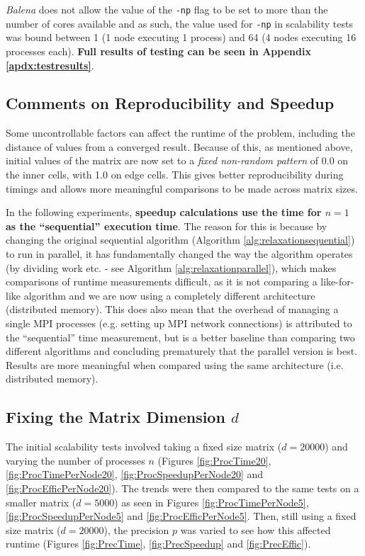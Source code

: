 \documentclass[11pt]{article}
\begin{document}
\textsl{Balena} does not allow the value of the \texttt{-np} flag to be set to more than the number of cores available and as such, the value used for \texttt{-np} in scalability tests was bound between 1 (1 node executing 1 process) and 64 (4 nodes executing 16 processes each). \textbf{Full results of testing can be seen in Appendix \ref{apdx:testresults}}. 

{\color{darkindigo}
\subsection*{Comments on Reproducibility and Speedup}}
Some uncontrollable factors can affect the runtime of the problem, including the distance of values from a converged result. Because of this, as mentioned above, initial values of the matrix are now set to a \textit{fixed non-random pattern} of 0.0 on the inner cells, with 1.0 on edge cells. This gives better reproducibility during timings and allows more meaningful comparisons to be made across matrix sizes. 

In the following experiments, \textbf{speedup calculations use the time for $n=1$ as the ``sequential'' execution time}. The reason for this is because by changing the original sequential algorithm (Algorithm \ref{alg:relaxationsequential}) to run in parallel, it has fundamentally changed the way the algorithm operates (by dividing work etc. - see Algorithm \ref{alg:relaxationparallel}), which makes comparisons of runtime measurements difficult, as it is not comparing a like-for-like algorithm and we are now using a completely different architecture (distributed memory). This does also mean that the overhead of managing a single MPI processes (e.g. setting up MPI network connections) is attributed to the ``sequential'' time measurement, but is a better baseline than comparing two different algorithms and concluding prematurely that the parallel version is best. Results are more meaningful when compared using the same architecture (i.e. distributed memory).

{\color{darkindigo}
\subsection{Fixing the Matrix Dimension $d$}}
The initial scalability tests involved taking a fixed size matrix ($d=20000$) and varying the number of processes $n$ (Figures \ref{fig:ProcTime20}, \ref{fig:ProcTimePerNode20}, \ref{fig:ProcSpeedupPerNode20} and \ref{fig:ProcEfficPerNode20}). The trends were then compared to the same tests on a smaller matrix ($d=5000$) as seen in Figures \ref{fig:ProcTimePerNode5}, \ref{fig:ProcSpeedupPerNode5} and \ref{fig:ProcEfficPerNode5}. Then, still using a fixed size matrix ($d=20000$), the precision $p$ was varied to see how this affected runtime (Figures \ref{fig:PrecTime}, \ref{fig:PrecSpeedup} and \ref{fig:PrecEffic}). 
\end{document}
